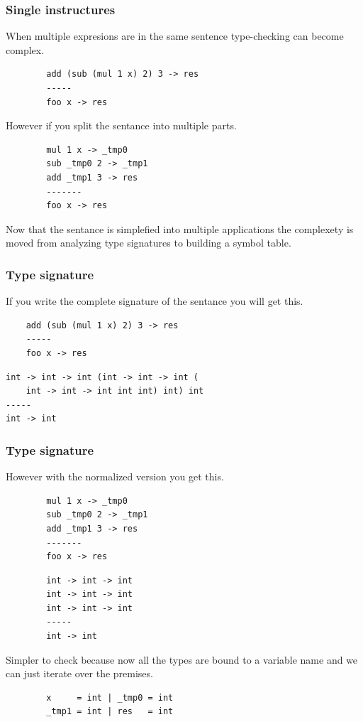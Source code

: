 \begin{frame}[fragile]
    \frametitle{Single instructures}
    When multiple expresions are in the same sentence type-checking can become complex.
    \begin{lstlisting}
        add (sub (mul 1 x) 2) 3 -> res
        -----
        foo x -> res
    \end{lstlisting}
    However if you split the sentance into multiple parts.
    \begin{lstlisting}
        mul 1 x -> _tmp0
        sub _tmp0 2 -> _tmp1
        add _tmp1 3 -> res
        -------
        foo x -> res
    \end{lstlisting}
    Now that the sentance is simplefied into multiple applications the complexety is moved from analyzing type signatures to building a symbol table.
\end{frame}

\begin{frame}[fragile]
    \frametitle{Type signature}
    If you write the complete signature of the sentance you will get this.
    \begin{lstlisting}
    add (sub (mul 1 x) 2) 3 -> res
    -----
    foo x -> res
    \end{lstlisting}
    \begin{lstlisting}
int -> int -> int (int -> int -> int (
    int -> int -> int int int) int) int
-----
int -> int  
    \end{lstlisting}
\end{frame}

\begin{frame}[fragile]
    \frametitle{Type signature}
    However with the normalized version you get this.
    \begin{lstlisting}
        mul 1 x -> _tmp0
        sub _tmp0 2 -> _tmp1
        add _tmp1 3 -> res
        -------
        foo x -> res
    \end{lstlisting}
    \begin{lstlisting}
        int -> int -> int
        int -> int -> int
        int -> int -> int
        -----
        int -> int
    \end{lstlisting}
    Simpler to check because now all the types are bound to a variable name and we can just iterate over the premises.
    \begin{lstlisting}
        x     = int | _tmp0 = int
        _tmp1 = int | res   = int
    \end{lstlisting} 
\end{frame}